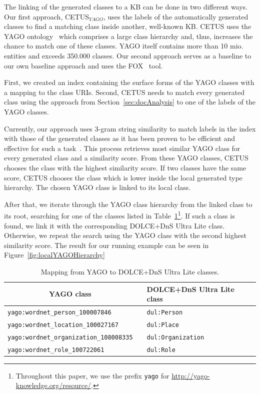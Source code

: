 The linking of the generated classes to a KB can be done in two different ways.
Our first approach, CETUS$_{YAGO}$,  uses the labels of the automatically generated classes to find a matching class inside another, well-known KB.
CETUS uses the YAGO ontology~\cite{mahdisoltani2014yago3} which comprises a large class hierarchy and, thus, increases the chance to match one of these classes.
YAGO itself contains more than 10 mio. entities and exceeds 350.000 classes.
Our second approach serves as a baseline to our own baseline approach and uses the FOX~\cite{FOX} tool.

First, we created an index containing the surface forms of the YAGO classes with a mapping to the class URIs.
Second, CETUS needs to match every generated class using the approach from Section~\ref{sec:docAnalysis} to one of the labels of the YAGO classes.

Currently, our approach uses 3-gram string similarity to match labels in the index with those of the generated classes as it has been proven to be efficient and effective for such a task~\cite{agdistis_iswc}.
This process retrieves most similar YAGO class for every generated class and a similarity score.
From these YAGO classes, CETUS chooses the class with the highest similarity score.
If two classes have the same score, CETUS chooses the class which is lower inside the local generated type hierarchy.
The chosen YAGO class is linked to its local class.

After that, we iterate through the YAGO class hierarchy from the linked class to its root, searching for one of the classes listed in Table~\ref{tab:yagoClassMatching}\footnote{Throughout this paper, we use the prefix \texttt{yago} for \url{http://yago-knowledge.org/resource/}.}.
If such a class is found, we link it with the corresponding DOLCE+DnS Ultra Lite class.
Otherwise, we repeat the search using the YAGO class with the second highest similarity score.
The result for our running example can be seen in Figure~\ref{fig:localYAGOHierarchy}
\begin{table}
\centering
\begin{tabular}{lp{5mm}l}
\toprule
 \multicolumn{1}{c}{YAGO class} && DOLCE+DnS Ultra Lite class \\
\midrule
 \texttt{yago:wordnet\_person\_100007846} && \texttt{dul:Person} \\
 \texttt{yago:wordnet\_location\_100027167} && \texttt{dul:Place} \\
 \texttt{yago:wordnet\_organization\_108008335} && \texttt{dul:Organization} \\
 \texttt{yago:wordnet\_role\_100722061} && \texttt{dul:Role} \\
\bottomrule
\end{tabular}
\caption{Mapping from YAGO to DOLCE+DnS Ultra Lite classes.}
\label{tab:yagoClassMatching}
\end{table}

